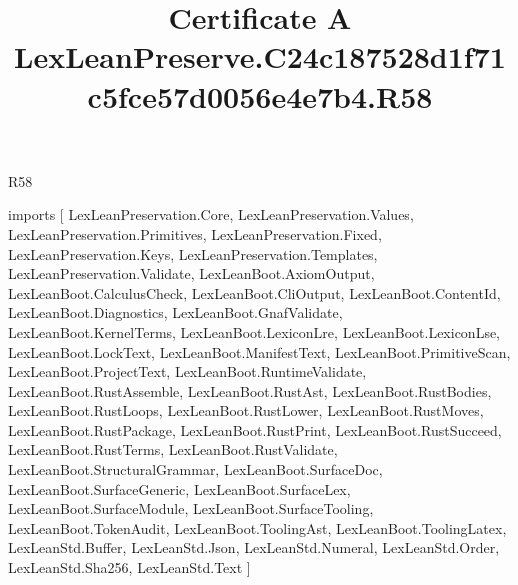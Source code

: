 \begin{lexlean}{R58}
\title{Certificate A LexLeanPreserve.C24c187528d1f71c5fce57d0056e4e7b4.R58}
\begin{coremodule}
imports [
  LexLeanPreservation.Core,
  LexLeanPreservation.Values,
  LexLeanPreservation.Primitives,
  LexLeanPreservation.Fixed,
  LexLeanPreservation.Keys,
  LexLeanPreservation.Templates,
  LexLeanPreservation.Validate,
  LexLeanBoot.AxiomOutput,
  LexLeanBoot.CalculusCheck,
  LexLeanBoot.CliOutput,
  LexLeanBoot.ContentId,
  LexLeanBoot.Diagnostics,
  LexLeanBoot.GnafValidate,
  LexLeanBoot.KernelTerms,
  LexLeanBoot.LexiconLre,
  LexLeanBoot.LexiconLse,
  LexLeanBoot.LockText,
  LexLeanBoot.ManifestText,
  LexLeanBoot.PrimitiveScan,
  LexLeanBoot.ProjectText,
  LexLeanBoot.RuntimeValidate,
  LexLeanBoot.RustAssemble,
  LexLeanBoot.RustAst,
  LexLeanBoot.RustBodies,
  LexLeanBoot.RustLoops,
  LexLeanBoot.RustLower,
  LexLeanBoot.RustMoves,
  LexLeanBoot.RustPackage,
  LexLeanBoot.RustPrint,
  LexLeanBoot.RustSucceed,
  LexLeanBoot.RustTerms,
  LexLeanBoot.RustValidate,
  LexLeanBoot.StructuralGrammar,
  LexLeanBoot.SurfaceDoc,
  LexLeanBoot.SurfaceGeneric,
  LexLeanBoot.SurfaceLex,
  LexLeanBoot.SurfaceModule,
  LexLeanBoot.SurfaceTooling,
  LexLeanBoot.TokenAudit,
  LexLeanBoot.ToolingAst,
  LexLeanBoot.ToolingLatex,
  LexLeanStd.Buffer,
  LexLeanStd.Json,
  LexLeanStd.Numeral,
  LexLeanStd.Order,
  LexLeanStd.Sha256,
  LexLeanStd.Text
]


\end{coremodule}
\end{lexlean}
